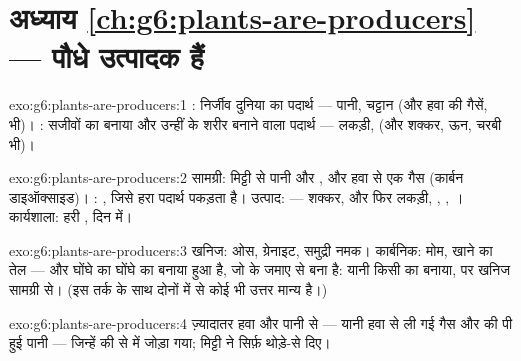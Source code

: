 \section*{अध्याय \ref{ch:g6:plants-are-producers} --- पौधे उत्पादक हैं}

\begin{solution}{exo:g6:plants-are-producers:1}
: निर्जीव दुनिया का पदार्थ --- पानी, चट्टान (और हवा की
गैसें,  भी)। : सजीवों का बनाया और उन्हीं के शरीर
बनाने वाला पदार्थ --- लकड़ी,  (और शक्कर, ऊन, चरबी भी)।
\end{solution}

\begin{solution}{exo:g6:plants-are-producers:2}
सामग्री: मिट्टी से पानी और , और हवा से एक गैस (कार्बन
डाइऑक्साइड)। : , जिसे हरा पदार्थ पकड़ता है। उत्पाद:  --- शक्कर, और फिर लकड़ी, , , । कार्यशाला: हरी ,
दिन में।
\end{solution}

\begin{solution}{exo:g6:plants-are-producers:3}
खनिज: ओस, ग्रेनाइट, समुद्री नमक। कार्बनिक: मोम, खाने का तेल --- और
घोंघे का  घोंघे का बनाया हुआ है, जो  के जमाए  से बना
है: यानी किसी  का बनाया, पर खनिज सामग्री से। (इस तर्क के साथ दोनों
में से कोई भी उत्तर मान्य है।)
\end{solution}

\begin{solution}{exo:g6:plants-are-producers:4}
ज़्यादातर हवा और पानी से --- यानी हवा से ली गई गैस और  की पी हुई
पानी --- जिन्हें  की  से  में जोड़ा गया; मिट्टी ने
सिर्फ़ थोड़े-से  दिए।
\end{solution}

